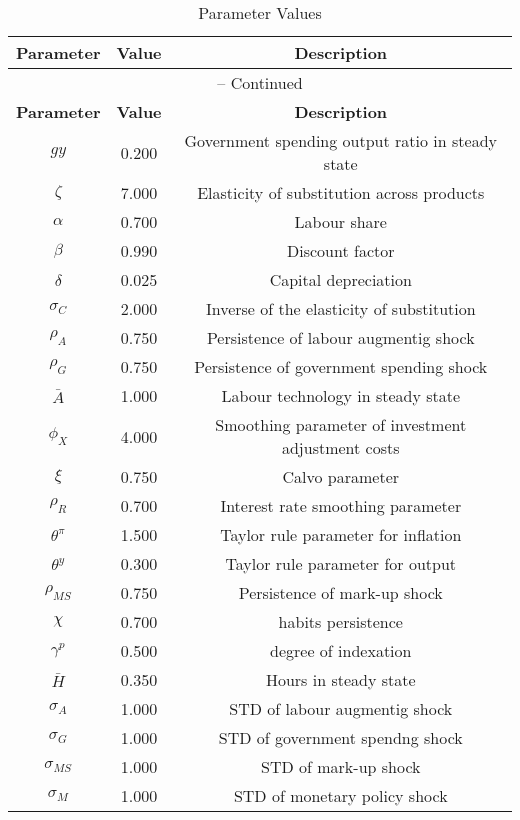 \begin{center}
\begin{longtable}{ccc}
\caption{Parameter Values}\\%
\toprule%
\multicolumn{1}{c}{\textbf{Parameter}} &
\multicolumn{1}{c}{\textbf{Value}} &
 \multicolumn{1}{c}{\textbf{Description}}\\%
\midrule%
\endfirsthead
\multicolumn{3}{c}{{\tablename} \thetable{} -- Continued}\\%
\midrule%
\multicolumn{1}{c}{\textbf{Parameter}} &
\multicolumn{1}{c}{\textbf{Value}} &
  \multicolumn{1}{c}{\textbf{Description}}\\%
\midrule%
\endhead
${gy}$ 	 & 	 0.200 	 & 	 Government spending output ratio in steady state\\
${\zeta}$ 	 & 	 7.000 	 & 	 Elasticity of substitution across products\\
${\alpha}$ 	 & 	 0.700 	 & 	 Labour share\\
${\beta}$ 	 & 	 0.990 	 & 	 Discount factor\\
${\delta}$ 	 & 	 0.025 	 & 	 Capital depreciation\\
${\sigma_{C}}$ 	 & 	 2.000 	 & 	 Inverse of the elasticity of substitution\\
${\rho_{A}}$ 	 & 	 0.750 	 & 	 Persistence of labour augmentig shock\\
${\rho_{G}}$ 	 & 	 0.750 	 & 	 Persistence of government spending shock\\
${\bar{A}}$ 	 & 	 1.000 	 & 	 Labour technology in steady state\\
${\phi_{X}}$ 	 & 	 4.000 	 & 	 Smoothing parameter of investment adjustment costs\\
${\xi}$ 	 & 	 0.750 	 & 	 Calvo parameter\\
${\rho_{R}}$ 	 & 	 0.700 	 & 	 Interest rate smoothing parameter\\
$\theta^{\pi}$ 	 & 	 1.500 	 & 	 Taylor rule parameter for inflation\\
$\theta^{y}$ 	 & 	 0.300 	 & 	 Taylor rule parameter for output\\
${\rho_{MS}}$ 	 & 	 0.750 	 & 	 Persistence of mark-up shock\\
${\chi}$ 	 & 	 0.700 	 & 	 habits persistence\\
${\gamma^{p}}$ 	 & 	 0.500 	 & 	 degree of indexation\\
${\bar{H}}$ 	 & 	 0.350 	 & 	 Hours in steady state\\
${\sigma_{A}}$ 	 & 	 1.000 	 & 	 STD of labour augmentig shock\\
${\sigma_{G}}$ 	 & 	 1.000 	 & 	 STD of government spendng shock\\
${\sigma_{MS}}$ 	 & 	 1.000 	 & 	 STD of mark-up shock\\
${\sigma_{M}}$ 	 & 	 1.000 	 & 	 STD of monetary policy shock\\
\bottomrule%
\end{longtable}
\end{center}

